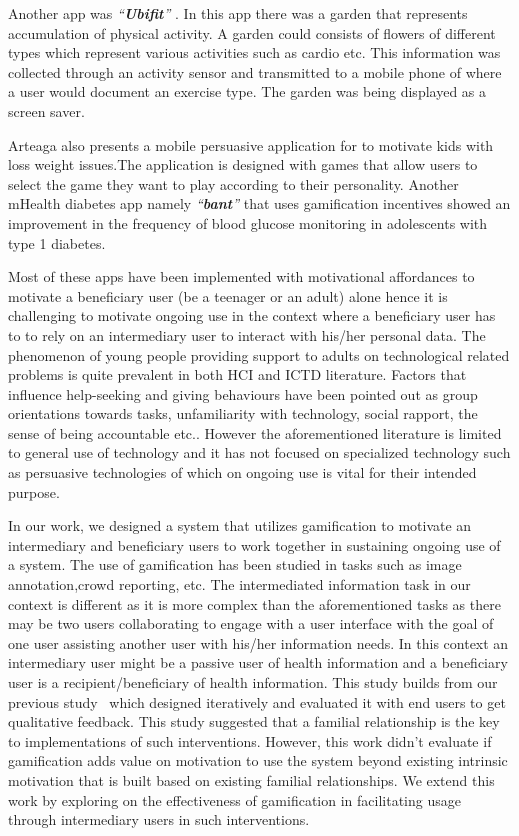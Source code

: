 \documentclass{sig-alternate}
\begin{document}
Another app was \emph{``\textbf{Ubifit}''} \cite{klasnja2009:using}. In this app there was a garden that represents accumulation of physical activity. A garden could consists of flowers of different types which represent various activities such as cardio etc. This information was collected through an activity sensor and transmitted to a mobile phone of where a user would document an exercise type. The garden was being displayed as a screen saver.

Arteaga \cite{arteaga2010:persuasive} also presents a mobile persuasive application for to motivate kids with loss weight issues.The application is designed with games that allow users to select the game they want to play according to their personality. Another mHealth diabetes app namely \emph{``\textbf{bant}''} that uses gamification incentives showed an improvement in the frequency of blood glucose monitoring in adolescents with type 1 diabetes.

Most of these apps have been implemented with motivational affordances to motivate a beneficiary user (be a teenager or an adult) alone hence it is challenging to motivate ongoing use in the context where a beneficiary user has to to rely on an intermediary user to interact with his/her personal data. The phenomenon of young people providing support to adults on technological related problems is quite prevalent in both HCI and ICTD literature. Factors that influence help-seeking and giving behaviours have been pointed out as group orientations towards tasks, unfamiliarity with technology, social rapport, the sense of being accountable etc.\cite{sambasivan2010,poole:chh,kiesler:twi,parikh2006}. However the aforementioned literature is limited to general use of technology and it has not focused on specialized technology such as persuasive technologies of which on ongoing use is vital for their intended purpose.

In our work, we designed a system that  utilizes gamification to motivate an intermediary and beneficiary users to work together in sustaining ongoing use of a system. The use of gamification has been studied in tasks such as image annotation\cite{mekler2013:disassembling},crowd reporting\cite{crowley2012:gamification}, etc. The intermediated information task in our context is different as it is more complex than the aforementioned tasks as there may be two users collaborating to engage with a user interface with the goal of one user assisting another user with his/her information needs. In this context an intermediary  user might be a passive user of health information and a beneficiary user is a recipient/beneficiary of health information. This study builds from our previous study~\cite{katule2016:leveraging} which designed iteratively and evaluated it with end users to get qualitative feedback. This study suggested that a familial relationship is the key to implementations of such interventions. However, this work didn't evaluate if gamification adds value on motivation to use the system beyond existing intrinsic motivation that is built based on existing familial relationships. We extend this work by exploring on the effectiveness of gamification in facilitating usage through intermediary users in such interventions.
\end{document}
